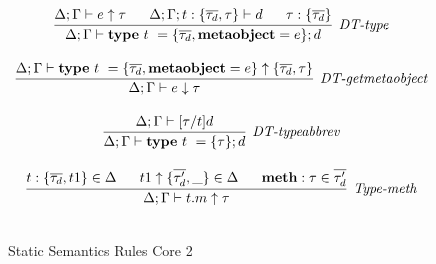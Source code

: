 \begin{figure}
\[\begin{array}{c}
\infer[\textit{DT-type}]
	{\Delta; \Gamma \vdash  \keyw{type}~ t~=\{\overline{\tau_d}, \keyw{metaobject}=e\}; d} 
	{\Delta; \Gamma \vdash e \uparrow\tau ~~~~~ \Delta; \Gamma; t:\{\overline{\tau_d},\tau\} \vdash d ~~~~~ \tau: \{\overline{\tau_d}\}  }\\[3ex]

\infer[\textit{DT-getmetaobject}]
        {\Delta; \Gamma \vdash e \downarrow \tau   }
	{\Delta; \Gamma \vdash  \keyw{type}~ t~=\{\overline{\tau_d}, \keyw{metaobject}=e\} \uparrow \{\overline{\tau_d},\tau\}} \\[3ex]
	

\infer[\textit{DT-typeabbrev}]
	{\Delta; \Gamma \vdash  \keyw{type}~ t~=\{\tau\}; d} 
	{\Delta; \Gamma \vdash [\tau/t]d }\\[3ex]


\infer[\textit{Type-meth}]
	{\Delta; \Gamma \vdash  t.m \uparrow\tau} 
	{t : \{\overline{\tau_d}, t1\} \in \Delta ~~~~~ t1  \uparrow \{\overline{\tau'_d},\_\} \in \Delta ~~~~~ \keyw{meth}:\tau \in \overline{\tau'_d}   }\\[3ex]
	

\end{array}
\]
\caption{Static Semantics Rules Core 2}
\end{figure}
